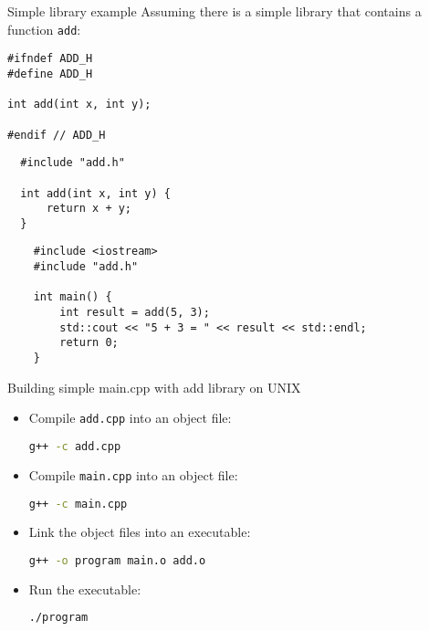 \documentclass{beamer}
\begin{document}
\begin{frame}[fragile]{Simple library example}
  Assuming there is a simple library that contains a function \texttt{add}:

  \lstset{style=CStyle, caption=add.h}
  \begin{lstlisting}
#ifndef ADD_H
#define ADD_H

int add(int x, int y);

#endif // ADD_H
  \end{lstlisting}

  \lstset{style=CStyle, caption=add.cpp}
  \begin{lstlisting}
  #include "add.h"
  
  int add(int x, int y) {
      return x + y;
  }
  \end{lstlisting}

  \lstset{style=CStyle, caption=main.cpp}
  \begin{lstlisting}
    #include <iostream>
    #include "add.h"
    
    int main() {
        int result = add(5, 3);
        std::cout << "5 + 3 = " << result << std::endl;
        return 0;
    }
  \end{lstlisting}
\end{frame}

\begin{frame}[fragile]{Building simple main.cpp with add library on UNIX}
  \begin{itemize}
    \item Compile \texttt{add.cpp} into an object file:
    \begin{lstlisting}[language=bash]
g++ -c add.cpp
    \end{lstlisting}
    \item Compile \texttt{main.cpp} into an object file:
    \begin{lstlisting}[language=bash]
g++ -c main.cpp
    \end{lstlisting}
    \item Link the object files into an executable:
    \begin{lstlisting}[language=bash]
g++ -o program main.o add.o
    \end{lstlisting}
    \item Run the executable:
    \begin{lstlisting}[language=bash]
./program
    \end{lstlisting}
  \end{itemize}
\end{frame}
\end{document}
